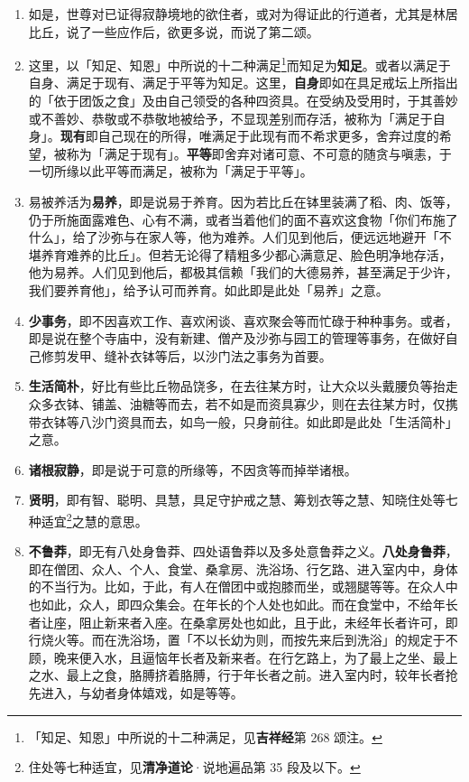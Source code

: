 \begin{enumerate}\item 如是，世尊对已证得寂静境地的欲住者，或对为得证此的行道者，尤其是林居比丘，说了一些应作后，欲更多说，而说了第二颂。
\item 这里，以「知足、知恩」中所说的十二种满足\footnote{「知足、知恩」中所说的十二种满足，见\textbf{吉祥经}第 268 颂注。}而知足为\textbf{知足}。或者以满足于自身、满足于现有、满足于平等为知足。这里，\textbf{自身}即如在具足戒坛上所指出的「依于团饭之食」及由自己领受的各种四资具。在受纳及受用时，于其善妙或不善妙、恭敬或不恭敬地被给予，不显现差别而存活，被称为「满足于自身」。\textbf{现有}即自己现在的所得，唯满足于此现有而不希求更多，舍弃过度的希望，被称为「满足于现有」。\textbf{平等}即舍弃对诸可意、不可意的随贪与嗔恚，于一切所缘以此平等而满足，被称为「满足于平等」。
\item 易被养活为\textbf{易养}，即是说易于养育。因为若比丘在钵里装满了稻、肉、饭等，仍于所施面露难色、心有不满，或者当着他们的面不喜欢这食物「你们布施了什么」，给了沙弥与在家人等，他为难养。人们见到他后，便远远地避开「不堪养育难养的比丘」。但若无论得了精粗多少都心满意足、脸色明净地存活，他为易养。人们见到他后，都极其信赖「我们的大德易养，甚至满足于少许，我们要养育他」，给予认可而养育。如此即是此处「易养」之意。
\item \textbf{少事务}，即不因喜欢工作、喜欢闲谈、喜欢聚会等而忙碌于种种事务。或者，即是说在整个寺庙中，没有新建、僧产及沙弥与园工的管理等事务，在做好自己修剪发甲、缝补衣钵等后，以沙门法之事务为首要。
\item \textbf{生活简朴}，好比有些比丘物品饶多，在去往某方时，让大众以头戴腰负等抬走众多衣钵、铺盖、油糖等而去，若不如是而资具寡少，则在去往某方时，仅携带衣钵等八沙门资具而去，如鸟一般，只身前往。如此即是此处「生活简朴」之意。
\item \textbf{诸根寂静}，即是说于可意的所缘等，不因贪等而掉举诸根。
\item \textbf{贤明}，即有智、聪明、具慧，具足守护戒之慧、筹划衣等之慧、知晓住处等七种适宜\footnote{住处等七种适宜，见\textbf{清净道论}·说地遍品第 35 段及以下。}之慧的意思。
\item \textbf{不鲁莽}，即无有八处身鲁莽、四处语鲁莽以及多处意鲁莽之义。\textbf{八处身鲁莽}，即在僧团、众人、个人、食堂、桑拿房、洗浴场、行乞路、进入室内中，身体的不当行为。比如，于此，有人在僧团中或抱膝而坐，或翘腿等等。在众人中也如此，众人，即四众集会。在年长的个人处也如此。而在食堂中，不给年长者让座，阻止新来者入座。在桑拿房处也如此，且于此，未经年长者许可，即行烧火等。而在洗浴场，置「不以长幼为则，而按先来后到洗浴」的规定于不顾，晚来便入水，且逼恼年长者及新来者。在行乞路上，为了最上之坐、最上之水、最上之食，胳膊挤着胳膊，行于年长者之前。进入室内时，较年长者抢先进入，与幼者身体嬉戏，如是等等。

\end{enumerate}
